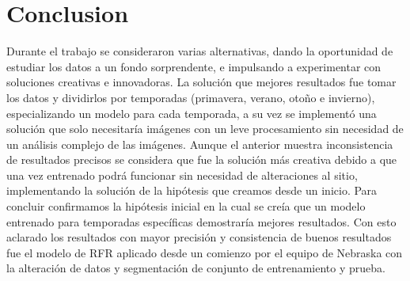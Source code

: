 \documentclass[../main.tex]{subfiles}
\begin{document}
\section{Conclusion}
Durante el trabajo se consideraron varias alternativas, dando la oportunidad de estudiar los datos a un fondo sorprendente, e impulsando a experimentar con soluciones creativas e innovadoras. La solución que mejores resultados fue tomar los datos y dividirlos por temporadas (primavera, verano, otoño e invierno), especializando un modelo para cada temporada, a su vez se implementó una solución que solo necesitaría imágenes con un leve procesamiento sin necesidad de un análisis complejo de las imágenes. Aunque el anterior muestra inconsistencia de resultados precisos se considera que fue la solución más creativa debido a que una vez entrenado podrá funcionar sin necesidad de alteraciones al sitio, implementando la solución de la hipótesis que creamos desde un inicio. Para concluir confirmamos la hipótesis inicial en la cual se creía que un modelo entrenado para temporadas específicas demostraría mejores resultados. Con esto aclarado los resultados con mayor precisión y consistencia de buenos resultados fue el modelo de RFR aplicado desde un comienzo por el equipo de Nebraska con la alteración de datos y segmentación de conjunto de entrenamiento y prueba.
\end{document}
